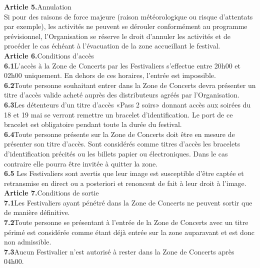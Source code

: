 \documentclass[hidelinks, paper=a4, fontsize=13pt]{report}
\begin{document}
\textbf{Article 5.}\hspace{3mm}Annulation\\
Si pour des raisons de force majeure (raison météorologique ou risque d'attentats par exemple), les activités ne peuvent se dérouler conformément au programme prévisionnel, l'Organisation se réserve le droit d’annuler les activités et de procéder le cas échéant à l’évacuation de la zone accueillant le festival.\\


\textbf{Article 6.}\hspace{3mm}Conditions d’accès\\
\textbf{6.1}\hspace{3mm}L’accès à la Zone de Concerts par les Festivaliers s’effectue entre 20h00 et 02h00 uniquement. En dehors de ces horaires, l’entrée est impossible. \\
\textbf{6.2}\hspace{3mm}Toute personne souhaitant entrer dans la Zone de Concerts devra présenter un titre d’accès valide acheté auprès des distributeurs agréés par l’Organisation.\\
\textbf{6.3}\hspace{3mm}Les détenteurs d’un titre d’accès «Pass 2 soirs» donnant accès aux soirées du 18 et 19 mai se verront remettre un bracelet d’identification. Le port de ce bracelet est obligatoire pendant toute la durée du festival.\\
\textbf{6.4}\hspace{3mm}Toute personne présente sur la Zone de Concerts doit être en mesure de présenter son titre d’accès. Sont considérés comme titres d’accès les bracelets d’identification précités ou les billets papier ou électroniques. Dans le cas contraire elle pourra être invitée à quitter la zone.\\
\textbf{6.5}\hspace{3mm} Les Festivaliers sont avertis que leur image est susceptible d'être captée et retransmise en direct ou a posteriori et renoncent de fait à leur droit à l'image.\\



\textbf{Article 7.}\hspace{3mm}Conditions de sortie\\
\textbf{7.1}\hspace{3mm}Les Festivaliers ayant pénétré dans la Zone de Concerts ne peuvent sortir que de manière définitive. \\
\textbf{7.2}\hspace{3mm}Toute personne se présentant à l’entrée de la Zone de Concerts avec un titre périmé est considérée comme étant déjà entrée sur la zone auparavant et est donc non admissible.\\
\textbf{7.3}\hspace{3mm}Aucun Festivalier n’est autorisé à rester dans la Zone de Concerts après 04h00. \\
\end{document}
